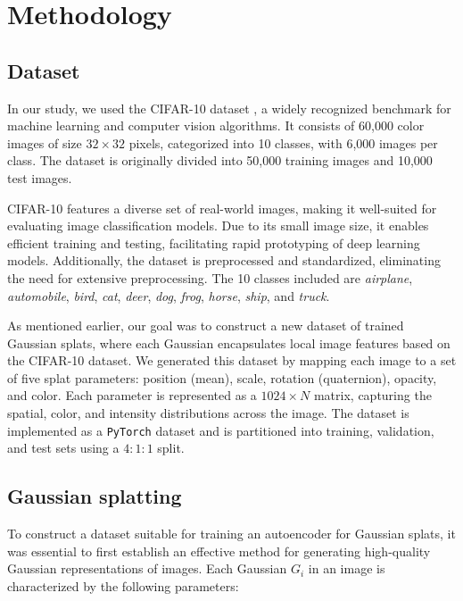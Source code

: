 \section{Methodology}
\label{sec:methodology}

\subsection{Dataset}
In our study, we used the CIFAR-10 dataset \cite{krizhevsky2009learningml}, a widely recognized benchmark for machine learning and computer vision algorithms. It consists of 60,000 color images of size $32 \times 32$ pixels, categorized into 10 classes, with 6,000 images per class. The dataset is originally divided into 50,000 training images and 10,000 test images.

CIFAR-10 features a diverse set of real-world images, making it well-suited for evaluating image classification models. Due to its small image size, it enables efficient training and testing, facilitating rapid prototyping of deep learning models. Additionally, the dataset is preprocessed and standardized, eliminating the need for extensive preprocessing. The 10 classes included are \textit{airplane}, \textit{automobile}, \textit{bird}, \textit{cat}, \textit{deer}, \textit{dog}, \textit{frog}, \textit{horse}, \textit{ship}, and \textit{truck}.

As mentioned earlier, our goal was to construct a new dataset of trained Gaussian splats, where each Gaussian encapsulates local image features based on the CIFAR-10 dataset. We generated this dataset by mapping each image to a set of five splat parameters: position (mean), scale, rotation (quaternion), opacity, and color. Each parameter is represented as a $1024 \times N$ matrix, capturing the spatial, color, and intensity distributions across the image. The dataset is implemented as a \texttt{PyTorch} dataset \cite{paszke2019pytorchai} and is partitioned into training, validation, and test sets using a $4 : 1 : 1$ split.

\subsection{Gaussian splatting}
To construct a dataset suitable for training an autoencoder for Gaussian splats, it was essential to first establish an effective method for generating high-quality Gaussian representations of images. Each Gaussian $G_i$ in an image is characterized by the following parameters:

